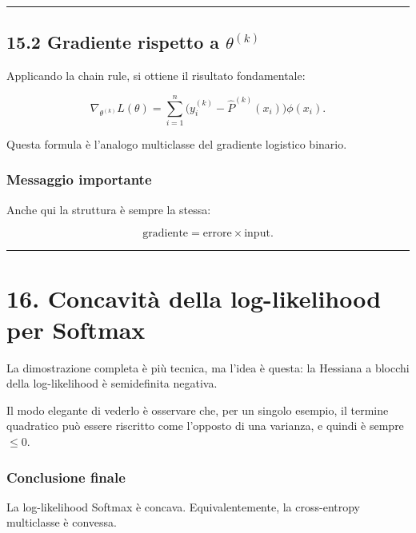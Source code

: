 \documentclass{article}
\begin{document}
\begin{center}\rule{0.5\linewidth}{0.5pt}\end{center}

\subsection{\texorpdfstring{15.2 Gradiente rispetto a
\(\theta^{(k)}\)}{15.2 Gradiente rispetto a \textbackslash theta\^{}\{(k)\}}}\label{gradiente-rispetto-a-thetak}

Applicando la chain rule, si ottiene il risultato fondamentale:

\[
\nabla_{\theta^{(k)}} L(\theta)
=
\sum_{i=1}^n \big(y_i^{(k)}-\hat P^{(k)}(x_i)\big)\phi(x_i).
\]

Questa formula è l'analogo multiclasse del gradiente logistico binario.

\subsubsection{Messaggio importante}\label{messaggio-importante}

Anche qui la struttura è sempre la stessa:

\[
\text{gradiente} = \text{errore} \times \text{input}.
\]

\begin{center}\rule{0.5\linewidth}{0.5pt}\end{center}

\section{16. Concavità della log-likelihood per
Softmax}\label{concavituxe0-della-log-likelihood-per-softmax}

La dimostrazione completa è più tecnica, ma l'idea è questa: la Hessiana
a blocchi della log-likelihood è semidefinita negativa.

Il modo elegante di vederlo è osservare che, per un singolo esempio, il
termine quadratico può essere riscritto come l'opposto di una varianza,
e quindi è sempre \(\le 0\).

\subsubsection{Conclusione finale}\label{conclusione-finale}

La log-likelihood Softmax è concava. Equivalentemente, la cross-entropy
multiclasse è convessa.
\end{document}
